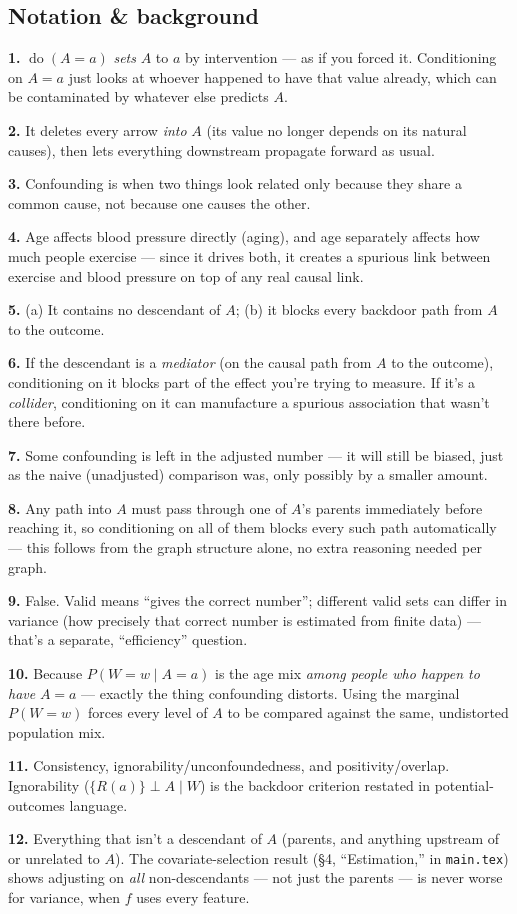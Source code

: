 \documentclass[11pt]{article}
\newcommand{\qa}[2]{\par\noindent\textbf{#1.} #2\par\smallskip}
\begin{document}
\subsection*{Notation \& background}
\qa{1}{$\operatorname{do}(A=a)$ \emph{sets} $A$ to $a$ by intervention ---
  as if you forced it. Conditioning on $A=a$ just looks at whoever
  happened to have that value already, which can be contaminated by
  whatever else predicts $A$.}
\qa{2}{It deletes every arrow \emph{into} $A$ (its value no longer depends
  on its natural causes), then lets everything downstream propagate
  forward as usual.}
\qa{3}{Confounding is when two things look related only because they share
  a common cause, not because one causes the other.}
\qa{4}{Age affects blood pressure directly (aging), and age separately
  affects how much people exercise --- since it drives both, it creates a
  spurious link between exercise and blood pressure on top of any real
  causal link.}
\qa{5}{(a) It contains no descendant of $A$; (b) it blocks every backdoor
  path from $A$ to the outcome.}
\qa{6}{If the descendant is a \emph{mediator} (on the causal path from $A$
  to the outcome), conditioning on it blocks part of the effect you're
  trying to measure. If it's a \emph{collider}, conditioning on it can
  manufacture a spurious association that wasn't there before.}
\qa{7}{Some confounding is left in the adjusted number --- it will still be
  biased, just as the naive (unadjusted) comparison was, only possibly by
  a smaller amount.}
\qa{8}{Any path into $A$ must pass through one of $A$'s parents
  immediately before reaching it, so conditioning on all of them blocks
  every such path automatically --- this follows from the graph structure
  alone, no extra reasoning needed per graph.}
\qa{9}{False. Valid means ``gives the correct number''; different valid
  sets can differ in variance (how precisely that correct number is
  estimated from finite data) --- that's a separate, ``efficiency''
  question.}
\qa{10}{Because $P(W{=}w\mid A{=}a)$ is the age mix \emph{among people who
  happen to have} $A=a$ --- exactly the thing confounding distorts. Using
  the marginal $P(W{=}w)$ forces every level of $A$ to be compared against
  the same, undistorted population mix.}
\qa{11}{Consistency, ignorability/unconfoundedness, and
  positivity/overlap. Ignorability ($\{R(a)\}\perp A\mid W$) is the
  backdoor criterion restated in potential-outcomes language.}
\qa{12}{Everything that isn't a descendant of $A$ (parents, and anything
  upstream of or unrelated to $A$). The covariate-selection result
  (\S4, ``Estimation,'' in \texttt{main.tex}) shows adjusting on
  \emph{all} non-descendants --- not just the parents --- is never worse
  for variance, when $f$ uses every feature.}
\end{document}
